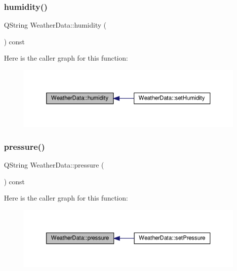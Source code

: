 \subsubsection{\texorpdfstring{humidity()}{humidity()}}
{\footnotesize\ttfamily Q\+String Weather\+Data\+::humidity (\begin{DoxyParamCaption}{ }\end{DoxyParamCaption}) const}

Here is the caller graph for this function\+:\nopagebreak
\begin{figure}[H]
\begin{center}
\leavevmode
\includegraphics[width=350pt]{class_weather_data_a0a83b2ee5398eaba062e3c6fe9264a3d_icgraph}
\end{center}
\end{figure}
\mbox{\label{class_weather_data_af726e713890bd6d310fe4a718dd69c77}} 
\subsubsection{\texorpdfstring{pressure()}{pressure()}}
{\footnotesize\ttfamily Q\+String Weather\+Data\+::pressure (\begin{DoxyParamCaption}{ }\end{DoxyParamCaption}) const}

Here is the caller graph for this function\+:\nopagebreak
\begin{figure}[H]
\begin{center}
\leavevmode
\includegraphics[width=350pt]{class_weather_data_af726e713890bd6d310fe4a718dd69c77_icgraph}
\end{center}
\end{figure}
\mbox{\label{class_weather_data_ab47f3e7cde6cf4d93dfb1750ac014f00}} 
